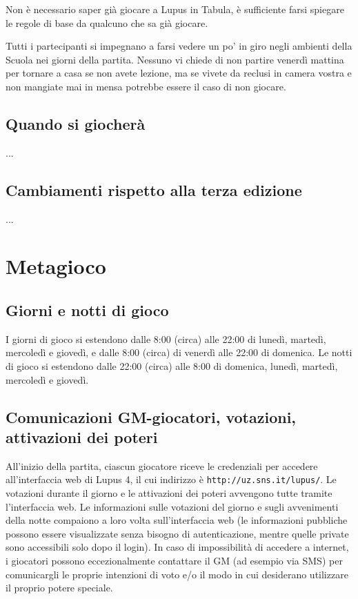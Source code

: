 \documentclass[a4paper,10pt]{article}
\begin{document}
Non è necessario saper già giocare a Lupus in Tabula, è sufficiente farsi spiegare le regole di base da qualcuno che sa già giocare.

Tutti i partecipanti si impegnano a farsi vedere un po' in giro negli ambienti della Scuola nei giorni della partita. Nessuno vi chiede di non partire venerdì mattina per tornare a casa se non avete lezione, ma se vivete da reclusi in camera vostra e non mangiate mai in mensa potrebbe essere il caso di non giocare.


\subsection{Quando si giocherà}

...


\subsection{Cambiamenti rispetto alla terza edizione}

...


\pagebreak
\section{Metagioco}

\subsection{Giorni e notti di gioco}

I giorni di gioco si estendono dalle 8:00 (circa) alle 22:00 di lunedì, martedì, mercoledì e giovedì, e dalle 8:00 (circa) di venerdì alle 22:00 di domenica.
Le notti di gioco si estendono dalle 22:00 (circa) alle 8:00 di domenica, lunedì, martedì, mercoledì e giovedì.



\subsection{Comunicazioni GM-giocatori, votazioni, attivazioni dei poteri}

All'inizio della partita, ciascun giocatore riceve le credenziali per accedere all'interfaccia web di Lupus 4, il cui indirizzo è \verb|http://uz.sns.it/lupus/|.
Le votazioni durante il giorno e le attivazioni dei poteri avvengono tutte tramite l'interfaccia web. Le informazioni sulle votazioni del giorno e sugli avvenimenti della notte compaiono a loro volta sull'interfaccia web (le informazioni pubbliche possono essere visualizzate senza bisogno di autenticazione, mentre quelle private sono accessibili solo dopo il login).
In caso di impossibilità di accedere a internet, i giocatori possono eccezionalmente contattare il GM (ad esempio via SMS) per comunicargli le proprie intenzioni di voto e/o il modo in cui desiderano utilizzare il proprio potere speciale.
\end{document}
